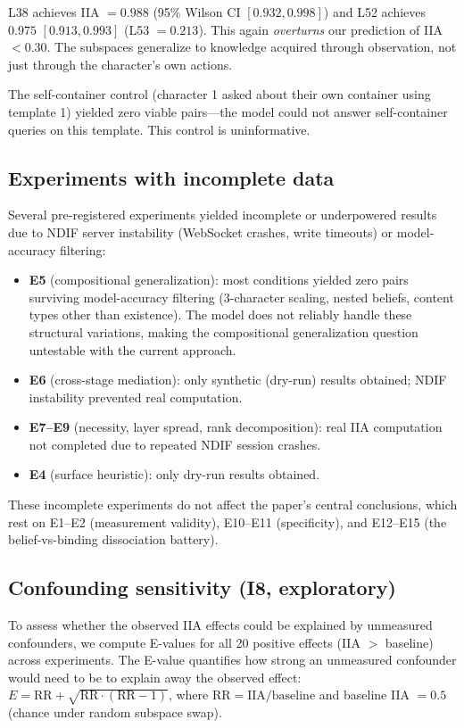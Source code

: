 \documentclass[11pt]{article}
\begin{document}
L38 achieves IIA $= 0.988$ (95\% Wilson CI $[0.932, 0.998]$) and L52 achieves $0.975$ $[0.913, 0.993]$ (L53 $= 0.213$). This again \emph{overturns} our prediction of IIA $< 0.30$. The subspaces generalize to knowledge acquired through observation, not just through the character's own actions.

The self-container control (character 1 asked about their own container using template 1) yielded zero viable pairs---the model could not answer self-container queries on this template. This control is uninformative.

\subsection{Experiments with incomplete data}

Several pre-registered experiments yielded incomplete or underpowered results due to NDIF server instability (WebSocket crashes, write timeouts) or model-accuracy filtering:

\begin{itemize}
\item \textbf{E5} (compositional generalization): most conditions yielded zero pairs surviving model-accuracy filtering (3-character scaling, nested beliefs, content types other than existence). The model does not reliably handle these structural variations, making the compositional generalization question untestable with the current approach.
\item \textbf{E6} (cross-stage mediation): only synthetic (dry-run) results obtained; NDIF instability prevented real computation.
\item \textbf{E7--E9} (necessity, layer spread, rank decomposition): real IIA computation not completed due to repeated NDIF session crashes.
\item \textbf{E4} (surface heuristic): only dry-run results obtained.
\end{itemize}

These incomplete experiments do not affect the paper's central conclusions, which rest on E1--E2 (measurement validity), E10--E11 (specificity), and E12--E15 (the belief-vs-binding dissociation battery).

\subsection{Confounding sensitivity (I8, exploratory)}

To assess whether the observed IIA effects could be explained by unmeasured confounders, we compute E-values \citep{vanderweele2017sensitivity} for all 20 positive effects (IIA $>$ baseline) across experiments. The E-value quantifies how strong an unmeasured confounder would need to be to explain away the observed effect: $E = \text{RR} + \sqrt{\text{RR} \cdot (\text{RR} - 1)}$, where $\text{RR} = \text{IIA} / \text{baseline}$ and baseline IIA $= 0.5$ (chance under random subspace swap).
\end{document}
